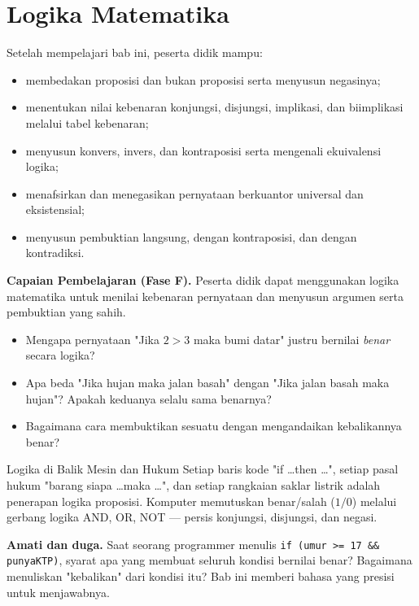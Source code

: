 \documentclass[11pt,a4paper]{report}
\theoremstyle{gaya}
\begin{document}
\chapter{Logika Matematika}
\begin{tujuan}
Setelah mempelajari bab ini, peserta didik mampu:
\begin{itemize}[leftmargin=*,topsep=2pt]
  \item membedakan proposisi dan bukan proposisi serta menyusun negasinya;
  \item menentukan nilai kebenaran konjungsi, disjungsi, implikasi, dan biimplikasi melalui tabel kebenaran;
  \item menyusun konvers, invers, dan kontraposisi serta mengenali ekuivalensi logika;
  \item menafsirkan dan menegasikan pernyataan berkuantor universal dan eksistensial;
  \item menyusun pembuktian langsung, dengan kontraposisi, dan dengan kontradiksi.
\end{itemize}
\textbf{Capaian Pembelajaran (Fase F).} Peserta didik dapat menggunakan logika matematika untuk menilai kebenaran pernyataan dan menyusun argumen serta pembuktian yang sahih.
\end{tujuan}

\begin{pemantik}
\begin{itemize}[leftmargin=*,topsep=2pt]
  \item Mengapa pernyataan "Jika $2>3$ maka bumi datar" justru bernilai \emph{benar} secara logika?
  \item Apa beda "Jika hujan maka jalan basah" dengan "Jika jalan basah maka hujan"? Apakah keduanya selalu sama benarnya?
  \item Bagaimana cara membuktikan sesuatu dengan mengandaikan kebalikannya benar?
\end{itemize}
\end{pemantik}

\begin{studikasus}{Logika di Balik Mesin dan Hukum}
Setiap baris kode "if \dots then \dots", setiap pasal hukum "barang siapa \dots maka \dots", dan setiap rangkaian saklar listrik adalah penerapan logika proposisi. Komputer memutuskan benar/salah ($1/0$) melalui gerbang logika AND, OR, NOT --- persis konjungsi, disjungsi, dan negasi.
\smallskip

\textbf{Amati dan duga.} Saat seorang programmer menulis \texttt{if (umur >= 17 \&\& punyaKTP)}, syarat apa yang membuat seluruh kondisi bernilai benar? Bagaimana menuliskan "kebalikan" dari kondisi itu? Bab ini memberi bahasa yang presisi untuk menjawabnya.
\end{studikasus}
\end{document}
